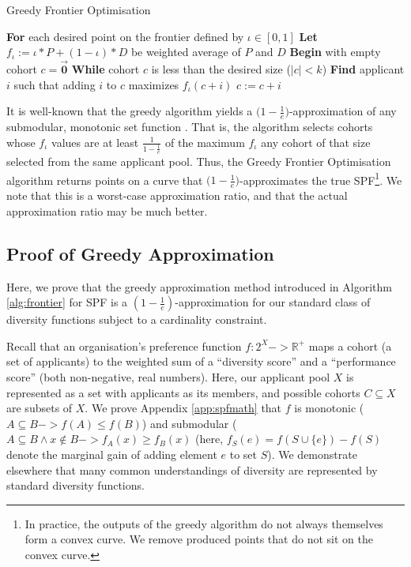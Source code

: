 \begin{algorithm}
    \caption{Greedy Frontier Optimisation}\label{alg:frontier}
    \begin{algorithmic}
    \State \textbf{For} each desired point on the frontier defined by $\iota \in [0, 1]$
    \State \hspace{\algorithmicindent} \textbf{Let} $f_{\iota} := \iota*P+(1-\iota)*D$ be weighted average of $P$ and $D$
    \State \hspace{\algorithmicindent} \textbf{Begin} with empty cohort $c = \vec{\mathbf{0}}$
    \State \hspace{\algorithmicindent} \textbf{While} cohort $c$ is less than the desired size ($|c| < k$)
    \State \hspace{\algorithmicindent} \hspace{\algorithmicindent} \textbf{Find} applicant $i$ such that adding $i$ to $c$ maximizes $f_{\iota}(c + i)$
    \State \hspace{\algorithmicindent} \hspace{\algorithmicindent} $c := c + i$
    \end{algorithmic}
\end{algorithm}


It is well-known that the greedy algorithm yields a $\bigl( 1-\frac{1}{e} \bigr)$-approximation of any submodular, monotonic set function \cite{bordeaux_submodular_2014}. That is, the algorithm selects cohorts whose $f_\iota$ values are at least $\frac{1}{1-\frac{1}{e}}$ of the maximum $f_\iota$ any cohort of that size selected from the same applicant pool. Thus, the Greedy Frontier Optimisation algorithm returns points on a curve that $\bigl( 1-\frac{1}{e} \bigr)$-approximates the true SPF\footnote{In practice, the outputs of the greedy algorithm do not always themselves form a convex curve. We remove produced points that do not sit on the convex curve.}. We note that this is a worst-case approximation ratio, and that the actual approximation ratio may be much better.

\subsection{Proof of Greedy Approximation}
Here, we prove that the greedy approximation method introduced in Algorithm \ref{alg:frontier} for SPF is a $(1-\frac{1}{e})$-approximation for our standard class of diversity functions subject to a cardinality constraint.

Recall that an organisation's preference function $f: 2^X -> \mathbb{R}^+$  maps a cohort (a set of applicants) to the weighted sum of a ``diversity score'' and a ``performance score'' (both non-negative, real numbers). Here, our applicant pool $X$ is represented as a set with applicants as its members, and possible cohorts $C \subseteq X$ are subsets of $X$. We prove Appendix \ref{app:spfmath} that $f$ is monotonic ($A \subseteq B -> f(A) \leq f(B)$) and submodular ($A \subseteq B \land x \notin B -> f_A(x) \geq f_B(x)$ (here, $f_S(e) = f(S \cup \{e\}) - f(S)$ denote the marginal gain of adding element $e$ to set $S$). We demonstrate elsewhere that many common understandings of diversity are represented by standard diversity functions.

